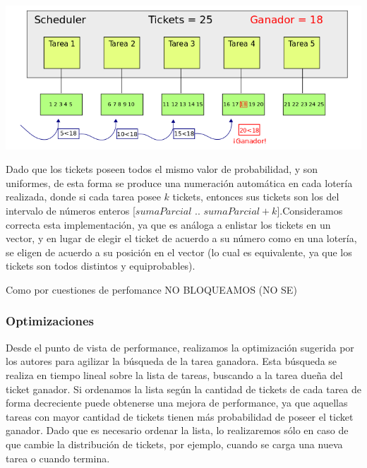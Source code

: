 \begin{center}
    \includegraphics[scale=0.6]{./Graficos/loteria.png}
\end{center}

Dado que los tickets poseen todos el mismo valor de probabilidad, y son uniformes, de esta forma se produce una numeraci\'on autom\'atica en cada loter\'ia realizada, donde si cada tarea posee $k$ tickets, entonces sus tickets son los del intervalo de n\'umeros enteros [$sumaParcial$ .. $sumaParcial + k$].Consideramos correcta esta implementaci\'on, ya que es an\'aloga a enlistar los tickets en un vector, y en lugar de elegir el ticket de acuerdo a su n\'umero como en una loter\'ia, se eligen de acuerdo a su posici\'on en el vector (lo cual es equivalente, ya que los tickets son todos distintos y equiprobables).

\vspace{2mm}

Como por cuestiones de perfomance NO BLOQUEAMOS (NO SE)

\subsubsection{Optimizaciones}

Desde el punto de vista de performance, realizamos la optimizaci\'on sugerida por los autores para agilizar la b\'usqueda de la tarea ganadora. Esta b\'usqueda se realiza en tiempo lineal sobre la lista de tareas, buscando a la tarea due\~na del ticket ganador. Si ordenamos la lista seg\'un la cantidad de tickets de cada tarea de forma decreciente puede obtenerse una mejora de performance, ya que aquellas tareas con mayor cantidad de tickets tienen m\'as probabilidad de poseer el ticket ganador. Dado que es necesario ordenar la lista, lo realizaremos s\'olo en caso de que cambie la distribuci\'on de tickets, por ejemplo, cuando se carga una nueva tarea o cuando termina. 

\vspace{2mm}

